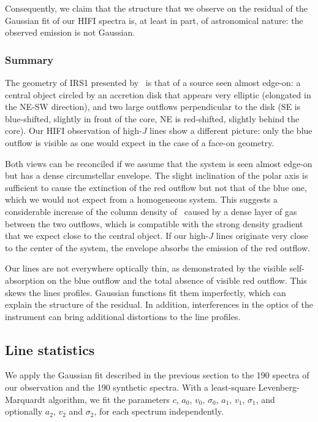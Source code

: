 Consequently, we claim that the structure that we observe on the residual of the Gaussian fit of our HIFI spectra is, at least in part, of astronomical nature: the observed emission is not Gaussian.




\subsubsection{Summary}
The geometry of IRS1 presented by~\textcite{maud2013s140} is that of a source seen almost edge-on: a central object circled by an accretion disk that appears very elliptic (elongated in the NE-SW direction), and two large  outflows perpendicular to the disk (SE is blue-shifted, slightly in front of the core, NE is red-shifted, slightly behind the core).
Our HIFI observation of high-$J$  lines show a different picture: only the blue outflow is visible as one would expect in the case of a face-on geometry.

Both views can be reconciled if we assume that the system is seen almost edge-on but has a dense circumstellar envelope.
The slight inclination of the polar axis is sufficient to cause the extinction of the red outflow but not that of the blue one, which we would not expect from a homogeneous system.
This suggests a considerable increase of the column density of~ caused by a dense layer of gas between the two outflows, which is compatible with the strong density gradient that we expect close to the central object.
If our high-$J$  lines originate very close to the center of the system,
the envelope absorbs the emission of the red outflow.

Our lines are not everywhere optically thin, as demonstrated by the visible self-absorption on the blue outflow and the total absence of visible red outflow.
This skews the lines profiles.
Gaussian functions fit them imperfectly, which can explain the structure of the residual.
In addition, interferences in the optics of the instrument can bring additional distortions to the line profiles.


\FloatBarrier
\subsection{Line statistics}
We apply the Gaussian fit described in the previous section to the 190 spectra of our observation and the 190 synthetic spectra.
With a least-square Levenberg-Marquardt algorithm, we fit the parameters
$c$,
$a_0$, $v_0$, $\sigma_0$,
$a_1$, $v_1$, $\sigma_1$, and optionally
$a_2$, $v_2$ and $\sigma_2$, for each spectrum independently.

